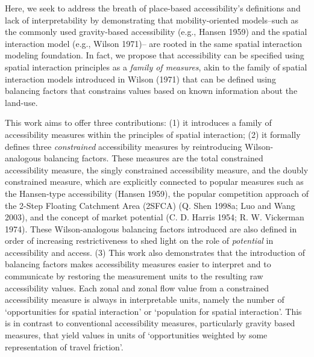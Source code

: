 \documentclass[
]{article}
\begin{document}
Here, we seek to address the breath of place-based accessibility's
definitions and lack of interpretability by demonstrating that
mobility-oriented models--such as the commonly used gravity-based
accessibility (e.g., Hansen 1959) and the spatial interaction model
(e.g., Wilson 1971)-- are rooted in the same spatial interaction
modeling foundation. In fact, we propose that accessibility can be
specified using spatial interaction principles as a \emph{family of
measures}, akin to the family of spatial interaction models introduced
in Wilson (1971) that can be defined using balancing factors that
constrains values based on known information about the land-use.

This work aims to offer three contributions: (1) it introduces a family
of accessibility measures within the principles of spatial interaction;
(2) it formally defines three \emph{constrained} accessibility measures
by reintroducing Wilson-analogous balancing factors. These measures are
the total constrained accessibility measure, the singly constrained
accessibility measure, and the doubly constrained measure, which are
explicitly connected to popular measures such as the Hansen-type
accessibility (Hansen 1959), the popular competition approach of the
2-Step Floating Catchment Area (2SFCA) (Q. Shen 1998a; Luo and Wang
2003), and the concept of market potential (C. D. Harris 1954; R. W.
Vickerman 1974). These Wilson-analogous balancing factors introduced are
also defined in order of increasing restrictiveness to shed light on the
role of \emph{potential} in accessibility and access. (3) This work also
demonstrates that the introduction of balancing factors makes
accessibility measures easier to interpret and to communicate by
restoring the measurement units to the resulting raw accessibility
values. Each zonal and zonal flow value from a constrained accessibility
measure is always in interpretable units, namely the number of
`opportunities for spatial interaction' or `population for spatial
interaction'. This is in contrast to conventional accessibility
measures, particularly gravity based measures, that yield values in
units of `opportunities weighted by some representation of travel
friction'.
\end{document}
